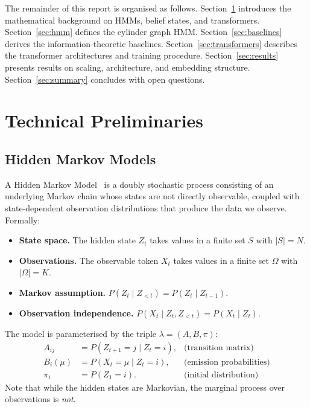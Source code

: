 \documentclass[11pt]{article}
\begin{document}
The remainder of this report is organised as follows.  Section~\ref{sec:prelim} introduces the mathematical background on HMMs, belief states, and transformers.  Section~\ref{sec:hmm} defines the cylinder graph HMM\@.  Section~\ref{sec:baselines} derives the information-theoretic baselines.  Section~\ref{sec:transformers} describes the transformer architectures and training procedure.  Section~\ref{sec:results} presents results on scaling, architecture, and embedding structure.  Section~\ref{sec:summary} concludes with open questions.

\section{Technical Preliminaries}\label{sec:prelim}

\subsection{Hidden Markov Models}\label{sec:hmm-def}

A Hidden Markov Model~\cite{baum1966,rabiner1986,rabiner1989} is a doubly stochastic process consisting of an underlying Markov chain whose states are not directly observable, coupled with state-dependent observation distributions that produce the data we observe.  Formally:
\begin{itemize}
  \item \textbf{State space.}  The hidden state $Z_t$ takes values in a finite set $S$ with $|S| = N$.
  \item \textbf{Observations.}  The observable token $X_t$ takes values in a finite set $\Omega$ with $|\Omega| = K$.
  \item \textbf{Markov assumption.}  $P(Z_t \mid Z_{<t}) = P(Z_t \mid Z_{t-1})$.
  \item \textbf{Observation independence.}  $P(X_t \mid Z_t, Z_{<t}) = P(X_t \mid Z_t)$.
\end{itemize}

The model is parameterised by the triple $\lambda = (A, B, \pi)$:
\begin{align}
  A_{ij}    &= P(Z_{t+1}{=}j \mid Z_t{=}i),     &\text{(transition matrix)} \\
  B_i(\mu)  &= P(X_t{=}\mu \mid Z_t{=}i),        &\text{(emission probabilities)} \\
  \pi_i     &= P(Z_1{=}i).                        &\text{(initial distribution)}
\end{align}
Note that while the hidden states are Markovian, the marginal process over observations is \emph{not}.
\end{document}
